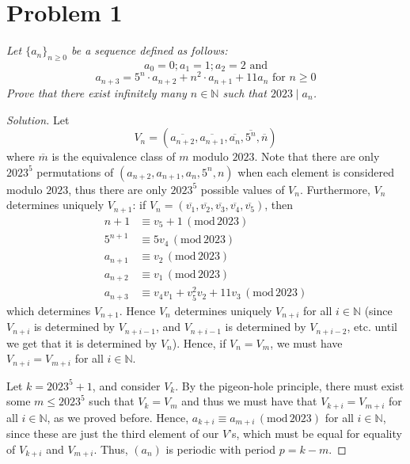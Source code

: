\documentclass{article}
\newcommand{\N}{{\mathbb N}}
\begin{document}
\section{Problem 1}
{\it Let $\{a_n\}_{n\geq 0}$ be a sequence defined as follows:
\[
	a_0 = 0; a_1 = 1; a_2 = 2 \text{ and}
\]
\[
	a_{n+3} = 5^n\cdot a_{n+2} + n^2\cdot a_{n+1} + 11a_n
	\text{ for }n\geq 0
\]
Prove that there exist infinitely many $n \in \N$
such that $2023 \mid a_n$.
}
\begin{proof}[Solution]\let\qed\relax
	Let
	\[
		V_n = (\overline{a_{n+2}}, \overline{a_{n+1}}, \overline{a_{n}},
		\overline{5^n}, \overline{n})
	\]
	where $\overline{m}$ is the equivalence class of $m$ modulo $2023$.
	Note that there are only $2023^5$ permutations of
	\newline$(a_{n+2}, a_{n+1}, a_{n}, 5^n, n)$ when each element
	is considered modulo $2023$,
	thus there are only $2023^5$ possible values of $V_n$.
	Furthermore, $V_n$ determines uniquely $V_{n+1}$:
	if $V_n =
	(\overline{v_1},\overline{v_2},\overline{v_3},\overline{v_4},\overline{v_5})$, then
	\begin{align*}
		n+1 &\equiv v_5 + 1 \,(\mathrm{mod}\, 2023)\\
		5^{n+1} &\equiv 5v_4 \,(\mathrm{mod}\, 2023)\\
		a_{n+1} &\equiv v_2 \,(\mathrm{mod}\, 2023)\\
		a_{n+2} &\equiv v_1 \,(\mathrm{mod}\, 2023)\\
		a_{n+3} &\equiv v_4v_1 + v_5^2v_2 + 11v_3 \,(\mathrm{mod}\, 2023)
	\end{align*}
	which determines $V_{n+1}$.
	Hence $V_n$ determines uniquely $V_{n+i}$ for all $i \in \N$
	(since $V_{n+i}$ is determined by $V_{n+i-1}$,
	and $V_{n+i-1}$ is determined by $V_{n+i-2}$, etc.
	until we get that it is determined by $V_{n}$).
	Hence, if $V_n = V_m$, we must have $V_{n+i} = V_{m+i}$
	for all $i \in \N$.

	Let $k = 2023^5 + 1$, and consider $V_k$.
	By the pigeon-hole principle, there must exist some $m \leq 2023^5$ such that
	$V_k = V_m$ and thus we must have that
	$V_{k+i} = V_{m+i}$ for all $i \in \N$, as we proved before.
	Hence, $a_{k+i} \equiv a_{m+i}\, (\mathrm{mod} \, 2023)$ for all $i \in \N$,
	since these are just the third element of our $V$'s,
	which must be equal for equality of $V_{k+i}$ and $V_{m+i}$.
	Thus, $(a_n)$ is periodic with period $p = k - m$.


\end{proof}
\end{document}
